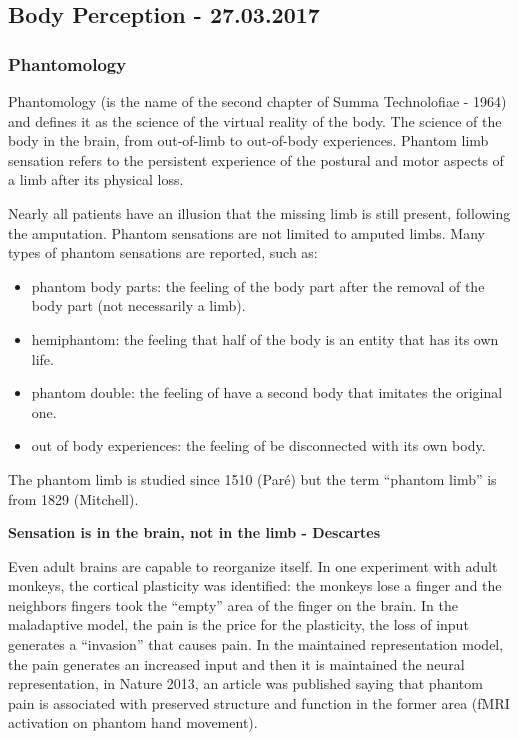\documentclass[12pt,article,oneside,a4paper]{memoir}
\begin{document}
\newpage
\subsection{Body Perception - 27.03.2017}
\subsubsection{Phantomology}
Phantomology (is the name of the second chapter of Summa Technolofiae - 1964)
and defines it as the science of the virtual reality of the body.
The science of the body in the brain, from out-of-limb to out-of-body experiences. 
Phantom  limb  sensation refers to the persistent experience of the postural and
motor aspects of a limb after its physical loss.

Nearly all patients have an illusion that the missing limb is still present,
following the amputation.
Phantom sensations are not limited to amputed limbs. Many types of phantom
sensations are reported, such as:
\begin{itemize}
\item phantom body parts: the feeling of the body part after the removal of the
body part (not necessarily a limb).
\item hemiphantom: the feeling that half of the body is an entity that has its
own life.
\item phantom double: the feeling of have a second body that imitates the
original one.
\item out of body experiences: the feeling of be disconnected with its own body.
\end{itemize}

The phantom limb is studied since 1510 (Paré) but the term ``phantom limb''
is from 1829 (Mitchell).

\textbf{Sensation is in the brain, not in the limb - Descartes}

Even adult brains are capable to reorganize itself. In one experiment with adult
monkeys, the cortical plasticity was identified: the monkeys lose a finger and
the neighbors fingers took the ``empty'' area of the finger on the brain.
In the maladaptive model, the pain is the price for the plasticity, the loss
of input generates a ``invasion'' that causes pain.
In the maintained representation model, the pain generates an increased input 
and then it is maintained the neural representation, in Nature 2013, an article
was published saying that phantom pain is associated with preserved structure
and function in the former area (fMRI activation on phantom hand movement).
\end{document}

